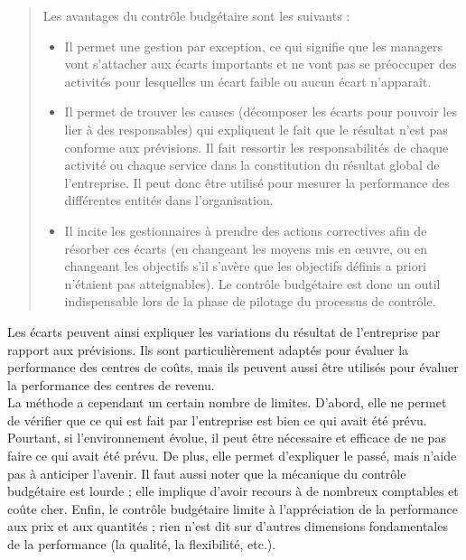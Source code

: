 \documentclass{kaobook}
\begin{document}
\begin{quote}
Les avantages du contrôle budgétaire sont les suivants :\\
\begin{itemize}
\item Il permet une gestion par exception, ce qui signifie que les managers vont s’attacher aux écarts importants et ne vont pas se préoccuper des activités pour lesquelles un écart faible ou aucun écart n’apparaît.\\
\item Il permet de trouver les causes (décomposer les écarts pour pouvoir les lier à des responsables) qui expliquent le fait que le résultat n'est pas conforme aux prévisions. Il fait ressortir les responsabilités de chaque activité ou chaque service dans la constitution du résultat global de l’entreprise. Il peut donc être utilisé pour mesurer la performance des différentes entités dans l’organisation.\\
\item Il incite les gestionnaires à prendre des actions correctives afin de résorber ces écarts (en changeant les moyens mis en œuvre, ou en changeant les objectifs s’il s’avère que les objectifs définis a priori n’étaient pas atteignables). Le contrôle budgétaire est donc un outil indispensable lors de la phase de pilotage du processus de contrôle.\\
\end{itemize}
\end{quote}

Les écarts peuvent ainsi expliquer les variations du résultat de l’entreprise par rapport aux prévisions. Ils sont particulièrement adaptés pour évaluer la performance des centres de coûts, mais ils peuvent aussi être utilisés pour évaluer la performance des centres de revenu.\\

La méthode a cependant un certain nombre de limites. D’abord, elle ne permet de vérifier que ce qui est fait par l’entreprise est bien ce qui avait été prévu. Pourtant, si l’environnement évolue, il peut être nécessaire et efficace de ne pas faire ce qui avait été prévu. De plus, elle permet d’expliquer le passé, mais n’aide pas à anticiper l’avenir. Il faut aussi noter que la mécanique du contrôle budgétaire est lourde ; elle implique d’avoir recours à de nombreux comptables et coûte cher. Enfin, le contrôle budgétaire limite à l’appréciation de la performance aux prix et aux quantités ; rien n’est dit sur d’autres dimensions fondamentales de la performance (la qualité, la flexibilité, etc.).\\
\end{document}

